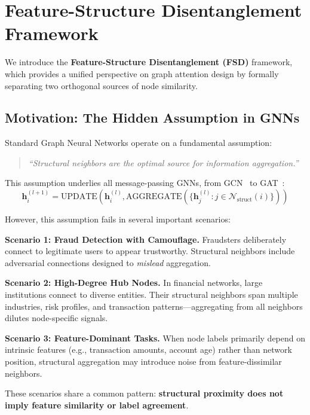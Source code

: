 \section{Feature-Structure Disentanglement Framework}
\label{sec:fsd}

We introduce the \textbf{Feature-Structure Disentanglement (FSD)} framework, which provides a unified perspective on graph attention design by formally separating two orthogonal sources of node similarity.

\subsection{Motivation: The Hidden Assumption in GNNs}

Standard Graph Neural Networks operate on a fundamental assumption:

\begin{quote}
\textit{``Structural neighbors are the optimal source for information aggregation.''}
\end{quote}

This assumption underlies all message-passing GNNs, from GCN~\cite{kipf2017gcn} to GAT~\cite{velivckovic2018gat}:
\begin{equation}
\mathbf{h}_i^{(l+1)} = \text{UPDATE}\left(\mathbf{h}_i^{(l)}, \text{AGGREGATE}\left(\{\mathbf{h}_j^{(l)} : j \in \mathcal{N}_{\text{struct}}(i)\}\right)\right)
\end{equation}

However, this assumption fails in several important scenarios:

\textbf{Scenario 1: Fraud Detection with Camouflage.} Fraudsters deliberately connect to legitimate users to appear trustworthy. Structural neighbors include adversarial connections designed to \textit{mislead} aggregation.

\textbf{Scenario 2: High-Degree Hub Nodes.} In financial networks, large institutions connect to diverse entities. Their structural neighbors span multiple industries, risk profiles, and transaction patterns---aggregating from all neighbors dilutes node-specific signals.

\textbf{Scenario 3: Feature-Dominant Tasks.} When node labels primarily depend on intrinsic features (e.g., transaction amounts, account age) rather than network position, structural aggregation may introduce noise from feature-dissimilar neighbors.

These scenarios share a common pattern: \textbf{structural proximity does not imply feature similarity or label agreement}.

